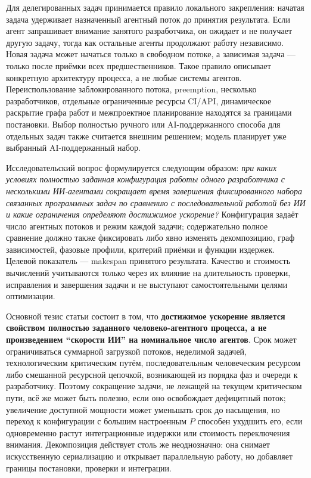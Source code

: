Для делегированных задач принимается правило локального закрепления: начатая
задача удерживает назначенный агентный поток до принятия результата. Если агент
запрашивает внимание занятого разработчика, он ожидает и не получает другую
задачу, тогда как остальные агенты продолжают работу независимо. Новая задача
может начаться только в свободном потоке, а зависимая задача --- только после
приёмки всех предшественников. Такое правило описывает конкретную архитектуру
процесса, а не любые системы агентов. Переиспользование заблокированного потока,
preemption, несколько разработчиков, отдельные ограниченные ресурсы CI/API,
динамическое раскрытие графа работ и межпроектное планирование находятся за
границами постановки. Выбор полностью ручного или AI-поддержанного способа для
отдельных задач также считается внешним решением; модель планирует уже
выбранный AI-поддержанный набор.

Исследовательский вопрос формулируется следующим образом: \emph{при каких
условиях полностью заданная конфигурация работы одного разработчика с
несколькими ИИ-агентами сокращает время завершения фиксированного набора
связанных программных задач по сравнению с последовательной работой без ИИ и
какие ограничения определяют достижимое ускорение?} Конфигурация задаёт число
агентных потоков и режим каждой задачи; содержательно полное сравнение должно
также фиксировать либо явно изменять декомпозицию, граф зависимостей, фазовые
профили, критерий приёмки и функции издержек. Целевой показатель --- makespan
принятого результата. Качество и стоимость вычислений учитываются только через
их влияние на длительность проверки, исправления и завершения задачи и не
выступают самостоятельными целями оптимизации.

Основной тезис статьи состоит в том, что \textbf{достижимое ускорение является
свойством полностью заданного человеко-агентного процесса, а не произведением
``скорости ИИ'' на номинальное число агентов}. Срок может ограничиваться
суммарной загрузкой потоков, неделимой задачей, технологическим критическим
путём, последовательным человеческим ресурсом либо смешанной ресурсной цепочкой,
возникающей из порядка фаз и очереди к разработчику. Поэтому сокращение задачи,
не лежащей на текущем критическом пути, всё же может быть полезно, если оно
освобождает дефицитный поток; увеличение доступной мощности может уменьшать
срок до насыщения, но переход к конфигурации с большим настроенным $P$ способен
ухудшить его, если одновременно растут интеграционные издержки или стоимость
переключения внимания. Декомпозиция действует столь же неоднозначно: она
снимает искусственную сериализацию и открывает параллельную работу, но добавляет
границы постановки, проверки и интеграции.

